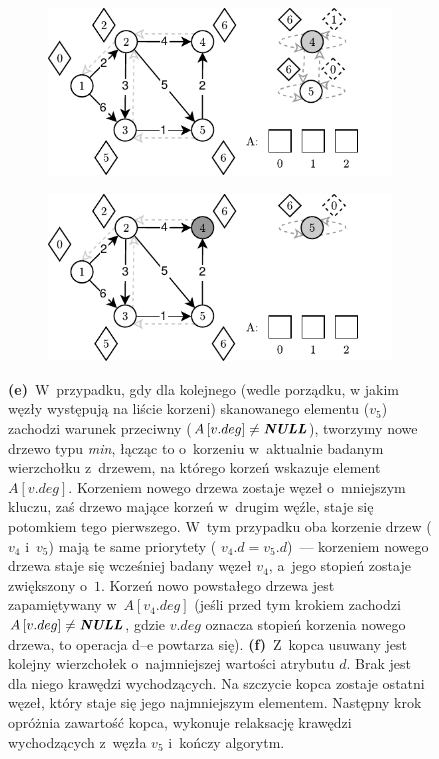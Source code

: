 \begin{figure}[!htbp]
	\ContinuedFloat
	\centering
	\null\hfill
	\begin{subfigure}[b]{0.46\textwidth}
		\includegraphics[width=\textwidth]{Chapter_II/FIBONACCI-Example/e.pdf}
		\caption{}
		\label{fig:exampleFibonacci:e}
	\end{subfigure}
	\hfill
	\begin{subfigure}[b]{0.46\textwidth}
		\includegraphics[width=\textwidth]{Chapter_II/FIBONACCI-Example/f.pdf}
		\caption{}
		\label{fig:exampleFibonacci:f}
	\end{subfigure}
	\hfill\null
	\caption{
		\textbf{(e)}~W~przypadku, gdy dla kolejnego (wedle porządku, w jakim węzły występują na liście korzeni) skanowanego elementu ($v_{5}$) zachodzi warunek przeciwny ($A \left[ v.deg \right] \neq \emph{\textbf{NULL}} $), tworzymy nowe drzewo typu \textit{min}, łącząc to o~korzeniu w~aktualnie badanym wierzchołku z~drzewem, na którego korzeń wskazuje element $A \left[ v.deg \right]$.
		Korzeniem nowego drzewa zostaje węzeł o~mniejszym kluczu, zaś drzewo mające korzeń w~drugim węźle, staje się potomkiem tego pierwszego.
		W~tym przypadku oba korzenie drzew ($v_{4}$ i~$v_{5}$) mają te same priorytety ( $v_{4}.d = v_{5}.d$)~--- korzeniem nowego drzewa staje się wcześniej badany węzeł $v_{4}$, a~jego stopień zostaje zwiększony o~$1$.
		Korzeń nowo powstałego drzewa jest zapamiętywany w~$A \left[ v_{4}.deg \right]$ (jeśli przed tym krokiem zachodzi $A \left[ v.deg \right] \neq \emph{\textbf{NULL}} $, gdzie $v.deg$ oznacza stopień korzenia nowego drzewa, to operacja d--e powtarza się).
		\textbf{(f)}~Z~kopca usuwany jest kolejny wierzchołek o~najmniejszej wartości atrybutu $d$.
		Brak jest dla niego krawędzi wychodzących.
		Na szczycie kopca zostaje ostatni węzeł, który staje się jego najmniejszym elementem.
		Następny krok opróżnia zawartość kopca, wykonuje relaksację krawędzi wychodzących z~węzła $v_{5}$ i~kończy algorytm.
	}
	\label{fig:exampleFibonacciB}
\end{figure}


